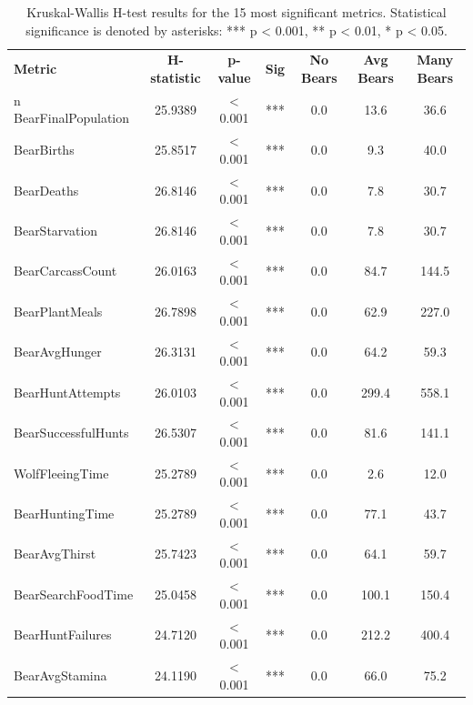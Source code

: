 \begin{table}[h!]
\centering
\caption{Kruskal-Wallis H-test results for the 15 most significant metrics. Statistical significance is denoted by asterisks: *** p < 0.001, ** p < 0.01, * p < 0.05.}
\label{tab:significance_main}
\small
\begin{tabular}{lcccccc}
\toprule
\textbf{Metric} & \textbf{H-statistic} & \textbf{p-value} & \textbf{Sig} & \textbf{No Bears} & \textbf{Avg Bears} & \textbf{Many Bears} \\n\midrule
BearFinalPopulation & 25.9389 & < 0.001 & *** & 0.0 & 13.6 & 36.6 \\
BearBirths & 25.8517 & < 0.001 & *** & 0.0 & 9.3 & 40.0 \\
BearDeaths & 26.8146 & < 0.001 & *** & 0.0 & 7.8 & 30.7 \\
BearStarvation & 26.8146 & < 0.001 & *** & 0.0 & 7.8 & 30.7 \\
BearCarcassCount & 26.0163 & < 0.001 & *** & 0.0 & 84.7 & 144.5 \\
BearPlantMeals & 26.7898 & < 0.001 & *** & 0.0 & 62.9 & 227.0 \\
BearAvgHunger & 26.3131 & < 0.001 & *** & 0.0 & 64.2 & 59.3 \\
BearHuntAttempts & 26.0103 & < 0.001 & *** & 0.0 & 299.4 & 558.1 \\
BearSuccessfulHunts & 26.5307 & < 0.001 & *** & 0.0 & 81.6 & 141.1 \\
WolfFleeingTime & 25.2789 & < 0.001 & *** & 0.0 & 2.6 & 12.0 \\
BearHuntingTime & 25.2789 & < 0.001 & *** & 0.0 & 77.1 & 43.7 \\
BearAvgThirst & 25.7423 & < 0.001 & *** & 0.0 & 64.1 & 59.7 \\
BearSearchFoodTime & 25.0458 & < 0.001 & *** & 0.0 & 100.1 & 150.4 \\
BearHuntFailures & 24.7120 & < 0.001 & *** & 0.0 & 212.2 & 400.4 \\
BearAvgStamina & 24.1190 & < 0.001 & *** & 0.0 & 66.0 & 75.2 \\
\bottomrule
\end{tabular}
\end{table}
